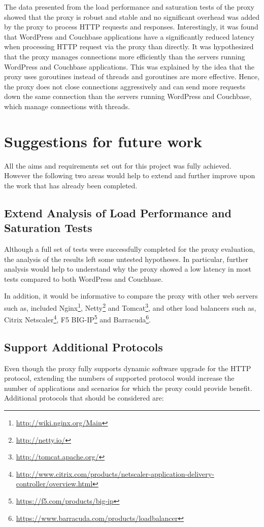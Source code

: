 \documentclass[a4paper,11pt,twoside]{report}
\begin{document}
The data presented from the load performance and saturation tests of the proxy showed that the proxy is robust and stable and no significant overhead was added by the proxy to process HTTP requests and responses. Interestingly, it was found that WordPress and Couchbase applications have a significantly reduced latency when processing HTTP request via the proxy than directly.  It was hypothesized that the proxy manages connections more efficiently than the servers running WordPress and Couchbase applications. This was explained by the idea that the proxy uses goroutines instead of threads and goroutines are more effective. Hence, the proxy does not close connections aggressively and can send more requests down the same connection than the servers running WordPress and Couchbase, which manage connections with threads.

\section{Suggestions for future work}
All the aims and requirements set out for this project was fully achieved. However the following two areas would help to extend and further improve upon the work that has already been completed.

\subsection{Extend Analysis of Load Performance and Saturation Tests}
Although a full set of tests were successfully completed for the proxy evaluation, the analysis of the results left some untested hypotheses.  In particular, further analysis would help to understand why the proxy showed a low latency in most tests compared to both WordPress and Couchbase.

In addition, it would be informative to compare the proxy with other web servers such as, included Nginx\footnote{\url{http://wiki.nginx.org/Main}}, Netty\footnote{\url{http://netty.io/}} and Tomcat\footnote{\url{http://tomcat.apache.org/}}, and other load balancers such as, Citrix Netscaler\footnote{\url{http://www.citrix.com/products/netscaler-application-delivery-controller/overview.html}}, F5 BIG-IP\footnote{\url{https://f5.com/products/big-ip}} and Barracuda\footnote{\url{https://www.barracuda.com/products/loadbalancer}}.

\subsection{Support Additional Protocols}
Even though the proxy fully supports dynamic software upgrade for the HTTP protocol, extending the numbers of supported protocol would increase the number of applications and scenarios for which the proxy could provide benefit.  Additional protocols that should be considered are:
\end{document}
